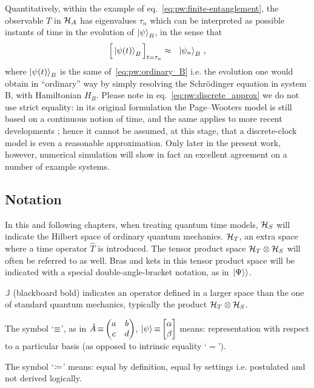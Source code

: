 Quantitatively, within the example of eq.~\eqref{eq:pw:finite-entanglement},
the observable $T$ in $\mathcal{H}_A$
has eigenvalues $\tau_n$ which can be interpreted as possible
instants of time in the evolution of $\ket{\psi}_B$, in the sense that
\begin{equation}\label{eq:pw:discrete_approx}
  \Big[ \ket{\psi(t)}_B \Big]_{t=\tau_n} \approx \,\,\,\, \ket{\psi_n}_B \, \text{,}
\end{equation}
where $\ket{\psi(t)}_B$ is the same of~\eqref{eq:pw:ordinary_B} i.e.
the evolution one would obtain in ``ordinary'' way
by simply resolving the Schr\"{o}dinger equation in system B, with Hamiltonian $H_B$.
Please note in eq.~\eqref{eq:pw:discrete_approx} we do not use strict equality:
in its original formulation the Page--Wooters model is still based on a continuous
notion of time, and the same applies to more recent developments \parencite{Lloyd:Time}; hence
it cannot be assumed, at this stage, that a discrete-clock model
is even a reasonable approximation.
Only later in the present work, however, numerical
simulation will show in fact an excellent agreement on a number of example systems.

\subsection*{Notation}

In this and following chapters, when treating quantum time models,
$\mathcal{H}_S$ will indicate the Hilbert space of ordinary quantum mechanics.
$\mathcal{H}_T$, an extra space where a time operator $\hat{T}$ is introduced. The tensor
product space $\mathcal{H}_T \otimes \mathcal{H}_S$
will often be referred to as well.
Bras and kets in this tensor product space will be indicated with a special double-angle-bracket
notation, as in $\left.\left| \Psi \right\rangle\right\rangle$.

${\mathbb{J}}$ (blackboard bold) indicates an  operator defined in
a larger space than the one of standard quantum mechanics,
typically the product $\mathcal{H}_T \otimes \mathcal{H}_S$.

The symbol `$\operatorname*{\equiv}$', as in $\hat{A} \repr \mqty(a&b\\c&d)$, $\ket{\psi} \repr \mqty[\alpha \\ \beta]$
means: representation with respect to a particular basis (as opposed to intrinsic equality `$=$').

The symbol `$\coloneqq$'
means: equal by definition, equal by settings i.e. postulated and not derived logically.
